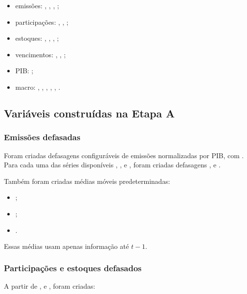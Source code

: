 \documentclass[12pt,a4paper]{article}
\begin{document}
\begin{itemize}[leftmargin=1.2cm]
    \item emissões: , , ,
    ;
    \item participações: , , ;
    \item estoques: , , ,
    ;
    \item vencimentos: , , ;
    \item PIB: ;
    \item macro: , , ,
    , , .
\end{itemize}

\subsection{Variáveis construídas na Etapa A}

\subsubsection{Emissões defasadas}

Foram criadas defasagens configuráveis de emissões normalizadas por PIB, com
. Para cada uma das séries disponíveis
, ,  e
, foram criadas defasagens ,  e
.

Também foram criadas médias móveis predeterminadas:

\begin{itemize}[leftmargin=1.2cm]
    \item {};
    \item {};
    \item {}.
\end{itemize}

Essas médias usam apenas informação até \(t-1\).

\subsubsection{Participações e estoques defasados}

A partir de ,  e , foram criadas:
\end{document}
